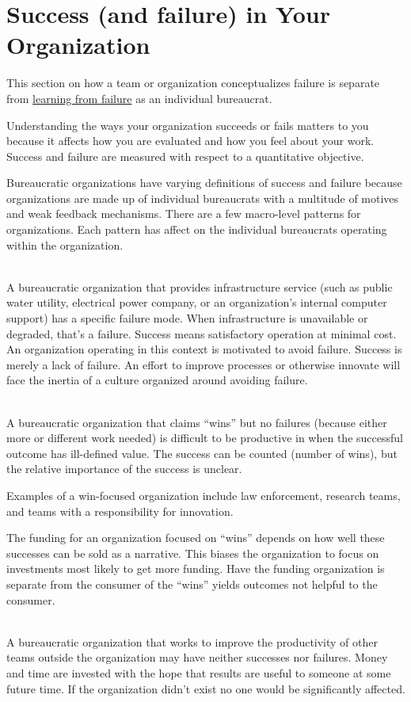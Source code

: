 \section{Success (and failure) in Your Organization\label{sec:org-failure-and-success}}

This section on how a team or organization conceptualizes failure is separate from %
\hyperref[sec:learn-from-failure]{learning from failure} as an individual bureaucrat. 

Understanding the ways your organization succeeds or fails matters to you because it affects how you are evaluated and how you feel about your work. Success and failure are measured with respect to a quantitative objective. 


Bureaucratic organizations have varying definitions of success and failure because organizations are made up of individual bureaucrats with a multitude of motives and weak feedback mechanisms. There are a few macro-level patterns for organizations. Each pattern has affect on the individual bureaucrats operating within the organization. 

\ \\

A bureaucratic organization that provides infrastructure service (such as public water utility, electrical power company, or an organization's internal computer support) has a specific failure mode. When infrastructure is unavailable or degraded, that's a failure. Success means satisfactory operation at minimal cost. An organization operating in this context is motivated to avoid failure. Success is merely a lack of failure. An effort to improve processes or otherwise innovate will face the inertia of a culture organized around avoiding failure. 

\ \\

A bureaucratic organization that claims ``wins'' but no failures (because either more or different work needed) is difficult to be productive in when the successful outcome has ill-defined value. The success can be counted (number of wins), but the relative importance of the success is unclear.

Examples of a win-focused organization include law enforcement, research teams, and teams with a responsibility for innovation. 

The funding for an organization focused on ``wins'' depends on how well these successes can be sold as a narrative. This biases the organization to focus on investments most likely to get more funding. Have the funding organization is separate from the consumer of the ``wins'' yields outcomes not helpful to the consumer.

\ \\

A bureaucratic organization that works to improve the productivity of other teams outside the organization may have neither successes nor failures. Money and time are invested with the hope that results are useful to someone at some future time. If the organization didn't exist no one would be significantly affected. 